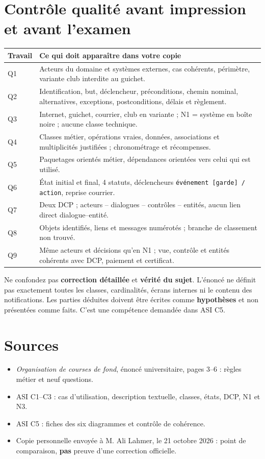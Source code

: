 \documentclass[10pt,a4paper]{article}
\begin{document}
\section{Contrôle qualité avant impression et avant l'examen}
\begin{tabularx}{\linewidth}{@{}p{19mm}X@{}}\toprule
Travail & Ce qui doit apparaître dans votre copie \\ \midrule
Q1 & Acteurs du domaine et systèmes externes, cas cohérents, périmètre, variante club interdite au guichet.\\
Q2 & Identification, but, déclencheur, préconditions, chemin nominal, alternatives, exceptions, postconditions, délais et règlement.\\
Q3 & Internet, guichet, courrier, club en variante ; N1 = système en boîte noire ; aucune classe technique.\\
Q4 & Classes métier, opérations vraies, données, associations et multiplicités justifiées ; chronométrage et récompenses.\\
Q5 & Paquetages orientés métier, dépendances orientées vers celui qui est utilisé.\\
Q6 & État initial et final, 4 statuts, déclencheurs \texttt{événement [garde] / action}, reprise courrier.\\
Q7 & Deux DCP ; acteurs -- dialogues -- contrôles -- entités, aucun lien direct dialogue--entité.\\
Q8 & Objets identifiés, liens et messages numérotés ; branche de classement non trouvé.\\
Q9 & Même acteurs et décisions qu'en N1 ; vue, contrôle et entités cohérents avec DCP, paiement et certificat.\\
\bottomrule\end{tabularx}
\begin{warningbox}
Ne confondez pas \textbf{correction détaillée} et \textbf{vérité du sujet}. L'énoncé ne définit pas exactement toutes les classes, cardinalités, écrans internes ni le contenu des notifications. Les parties déduites doivent être écrites comme \textbf{hypothèses} et non présentées comme faits. C'est une compétence demandée dans ASI C5.
\end{warningbox}
\section*{Sources}
\begin{itemize}
\item \textit{Organisation de courses de fond}, énoncé universitaire, pages 3--6 : règles métier et neuf questions.
\item ASI C1--C3 : cas d'utilisation, description textuelle, classes, états, DCP, N1 et N3.
\item ASI C5 : fiches des six diagrammes et contrôle de cohérence.
\item Copie personnelle envoyée à M. Ali Lahmer, le 21 octobre 2026 : point de comparaison, \textbf{pas} preuve d'une correction officielle.
\end{itemize}
\end{document}
